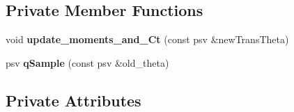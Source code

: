 \subsection*{Private Member Functions}
\begin{DoxyCompactItemize}
\item 
\mbox{\label{classada__pmmh_a5b3a686b52091b340f9a720b4a51a32d}} 
void {\bfseries update\+\_\+moments\+\_\+and\+\_\+\+Ct} (const psv \&new\+Trans\+Theta)
\item 
\mbox{\label{classada__pmmh_ad48139f3c5cd80d36135a42b4c09aec3}} 
psv {\bfseries q\+Sample} (const psv \&old\+\_\+theta)
\end{DoxyCompactItemize}
\subsection*{Private Attributes}
